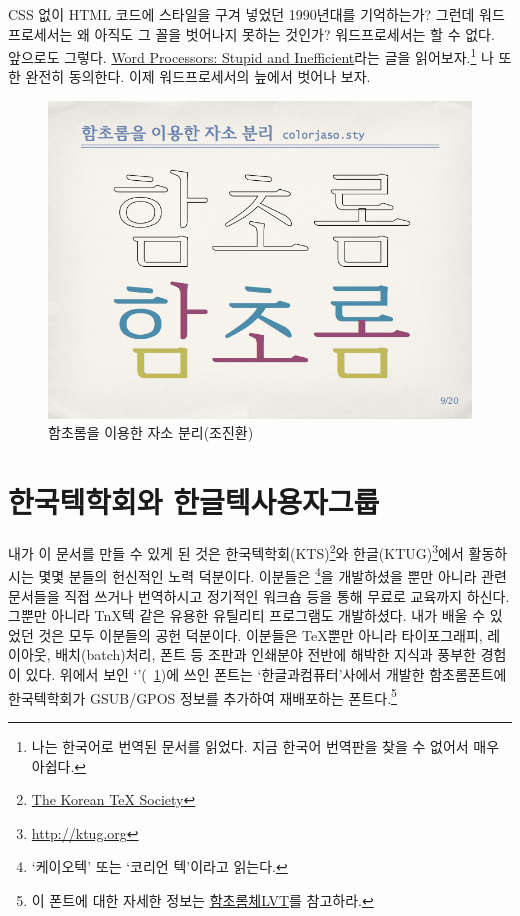 \documentclass[oneside, chapter, 11pt]{oblivoir}
\begin{document}
CSS 없이 HTML 코드에 스타일을 구겨 넣었던 1990년대를 기억하는가? 그런데 워드프로세서는 왜 아직도 그 꼴을 벗어나지 못하는 것인가? 워드프로세서는 할 수 없다. 앞으로도 그렇다. \href{http://ricardo.ecn.wfu.edu/~cottrell/wp.html}{Word Processors: Stupid and Inefficient}라는 글을 읽어보자.\footnote{나는 한국어로 번역된 문서를 읽었다. 지금 한국어 번역판을 찾을 수 없어서 매우 아쉽다.} 나 또한 완전히 동의한다. 이제 워드프로세서의 늪에서 벗어나 보자.

\begin{figure}[!hbtp]
\caption{함초롬을 이용한 자소 분리(조진환)}
\label{fig:hcr}
\includegraphics[width=\textwidth]{KTS2011-chof}
\end{figure}

\section{한국텍학회와 한글텍사용자그룹}\label{sec:ktug}
내가 이 문서를 만들 수 있게 된 것은 한국텍학회(KTS)\footnote{\href{http://www.ktug.org/xe/?mid=KTS}{The Korean TeX Society}}와 한글(KTUG)\footnote{\href{http://ktug.org}{http://ktug.org}}에서 활동하시는 몇몇 분들의 헌신적인 노력 덕분이다. 이분들은 \koTeX\footnote{`케이오텍' 또는 `코리언 텍'이라고 읽는다.}을 개발하셨을 뿐만 아니라 관련 문서들을 직접 쓰거나 번역하시고 정기적인 워크숍 등을 통해 무료로 교육까지 하신다. 그뿐만 아니라 TnX텍 같은 유용한 유틸리티 프로그램도 개발하셨다. 내가  배울 수 있었던 것은 모두 이분들의 공헌 덕분이다. 이분들은 \TeX 뿐만 아니라 타이포그래피, 레이아웃, 배치(batch)처리, 폰트 등 조판과 인쇄분야 전반에 해박한 지식과 풍부한 경험이 있다. 위에서 보인 `'(\figurename~\ref{fig:hcr})에 쓰인 폰트는 `한글과컴퓨터'사에서 개발한 함초롬폰트에 한국텍학회가 GSUB/GPOS 정보를 추가하여 재배포하는 폰트\label{hcr}다.\footnote{이 폰트에 대한 자세한 정보는 \href{http://wiki.ktug.org/wiki/wiki.php/\%ED\%95\%A8\%EC\%B4\%88\%EB\%A1\%AC\%EC\%B2\%B4LVT}{함초롬체LVT}를 참고하라.}
\end{document}

